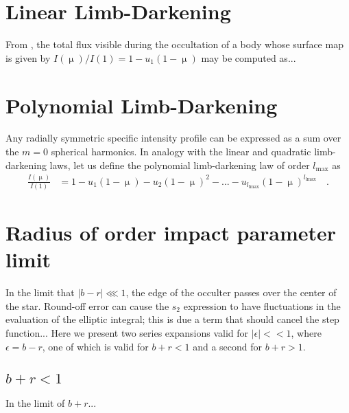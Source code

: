 \documentclass[modern]{aastex61}
\begin{document}
%
\section{Linear Limb-Darkening}
\label{sec:reparam}

From \citet{MandelAgol2002}, the total flux visible during the occultation of a  
body whose surface map is given by $I(\upmu)/I(1) = 1 - u_1(1 - \upmu)$ may be computed
as...

%
\section{Polynomial Limb-Darkening}
\label{sec:quad}

Any radially symmetric specific intensity profile can be expressed as a sum
over the $m = 0$ spherical harmonics. In analogy with the linear and quadratic
limb-darkening laws, let us define the polynomial limb-darkening law of
order $l_\mathrm{max}$ as
%
%
\begin{align}
    \label{eq:polynomialld}
    \frac{I(\upmu)}{I(1)} &= 1 - u_1 (1 - \upmu) - u_2 (1 - \upmu)^2 - ... - u_{l_\mathrm{lmax}}(1 - \upmu)^{l_\mathrm{lmax}}
    \quad.
\end{align}
%


\section{Radius of order impact parameter limit}

In the limit that $\vert b -r\vert \lll 1$, the edge of the occulter passes
over the center of the star.  Round-off error can cause the $s_2$ expression
to have fluctuations in the evaluation of the elliptic integral; this is
due a term that should cancel the step function...
Here we present two series expansions valid
for $\vert \epsilon \vert << 1$, where $\epsilon = b-r$, one of which is valid
for $b+r <1$ and a second for $b+r > 1$.

\subsection{$b+r <1$}

In the limit of $b+r$...



\end{document}
